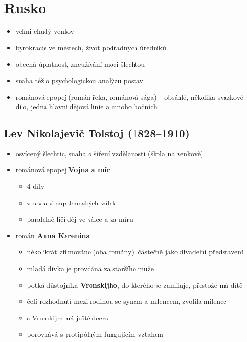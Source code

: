 \section{Rusko}
\begin{itemize}
\item velmi chudý venkov
\item byrokracie ve městech, život podřadných úředníků
\item obecná úplatnost, zneužívání moci šlechtou
\item snaha též o psychologickou analýzu postav
\item románová epopej (román řeka, románová sága) -- obsáhlé, několika svazkové dílo, jedna hlavní dějová linie a mnoho bočních
\end{itemize}

\subsection{Lev Nikolajevič Tolstoj (1828--1910)}
\begin{itemize}
\item osvícený šlechtic, snaha o šíření vzdělanosti (škola na venkově)
\item románová epopej \textbf{Vojna a mír}
	\begin{itemize}
	\item 4 díly
	\item z období napoleonských válek
	\item paralelně líčí děj ve válce a za míru
	\end{itemize}
\item román \textbf{Anna Karenina}
	\begin{itemize}
	\item několikrát zfilmováno (oba romány), částečně jako divadelní představení
	\item mladá dívka je provdána za staršího muže
	\item potká důstojníka \textbf{Vronskijho}, do kterého se zamiluje, přestože má dítě
	\item čelí rozhodnutí mezi rodinou se synem a milencem, zvolila milence
	\item s Vronskijm má ještě dceru
	\item porovnává s protipólným fungujícím vztahem
	\end{itemize}
\end{itemize}

